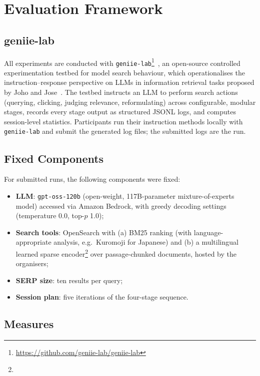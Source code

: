 \documentclass[sigconf,article]{acmart}
\begin{document}
\section{Evaluation Framework}
\label{sec:framework}

\subsection{geniie-lab}

All experiments are conducted with \texttt{geniie-lab}\footnote{%
\url{https://github.com/geniie-lab/geniie-lab}}~\cite{joho2025sigirap}, an
open-source controlled experimentation testbed for model search behaviour,
which operationalises the instruction--response perspective on LLMs in
information retrieval tasks proposed by Joho and Jose~\cite{joho2025sigir}. The testbed
instructs an LLM to perform search actions (querying, clicking, judging
relevance, reformulating) across configurable, modular stages, records every
stage output as structured JSONL logs, and computes session-level statistics.
Participants run their instruction methods locally with \texttt{geniie-lab}
and submit the generated log files; the submitted logs are the run.

\subsection{Fixed Components}

For submitted runs, the following components were fixed:

\begin{itemize}
  \item \textbf{LLM}: \texttt{gpt-oss-120b} (open-weight, 117B-parameter
  mixture-of-experts model) accessed via Amazon Bedrock, with greedy
  decoding settings (temperature 0.0, top-$p$ 1.0);
  \item \textbf{Search tools}: OpenSearch with (a) BM25 ranking (with
  language-appropriate analysis, e.g.\ Kuromoji for Japanese) and (b) a
  multilingual learned sparse encoder\footnote{%
  } over
  passage-chunked documents, hosted by the organisers;
  \item \textbf{SERP size}: ten results per query;
  \item \textbf{Session plan}: five iterations of the four-stage sequence.
\end{itemize}

\subsection{Measures}
\end{document}
